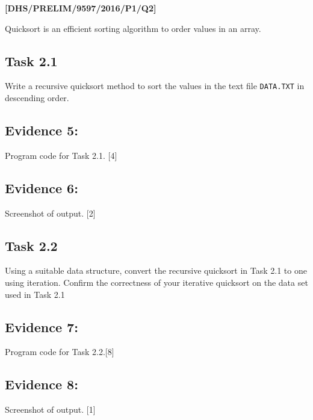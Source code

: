 \item \textbf{{[}DHS/PRELIM/9597/2016/P1/Q2{]} }

Quicksort is an efficient sorting algorithm to order values in an
array. 

\subsection*{Task 2.1 }

Write a recursive quicksort method to sort the values in the text
file \texttt{DATA.TXT} in descending order. 

\subsection*{Evidence 5: }

Program code for Task 2.1. \hfill{}{[}4{]}

\subsection*{Evidence 6:}

Screenshot of output. \hfill{}{[}2{]}

\subsection*{Task 2.2 }

Using a suitable data structure, convert the recursive quicksort in
Task 2.1 to one using iteration. Confirm the correctness of your iterative
quicksort on the data set used in Task 2.1 

\subsection*{Evidence 7:}

Program code for Task 2.2.\hfill{}{[}8{]}

\subsection*{Evidence 8: }

Screenshot of output. \hfill{}{[}1{]}